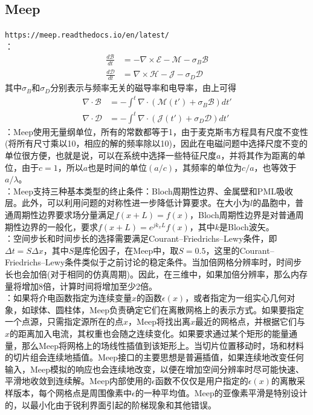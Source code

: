 \documentclass{article}
\numberwithin{equation}{section}
\renewcommand{\vec}[1]{\boldsymbol{#1}}
\begin{document}
\subsection{Meep}
\texttt{https://meep.readthedocs.io/en/latest/} \\
\textbf{\color{blue}{Meep仿真的麦克斯韦方程}}：
\begin{align}
    \frac{d\vec{\mathcal{B}}}{dt}&=-\nabla\times\vec{\mathcal{E}}-\vec{\mathcal{M}}-\sigma_B\vec{\mathcal{B}} \\
    \frac{d\vec{\mathcal{D}}}{dt}&=\nabla\times\vec{\mathcal{H}}-\vec{\mathcal{J}}-\sigma_D\vec{\mathcal{D}}
\end{align}
其中$\sigma_B$和$\sigma_D$分别表示与频率无关的磁导率和电导率，由上可得
\begin{align}
    \nabla\cdot\vec{\mathcal{B}}&=-\int^t\nabla\cdot\left(\vec{\mathcal{M}}(t')+\sigma_B\vec{\mathcal{B}}\right)dt' \\
    \nabla\cdot\vec{\mathcal{D}}&=-\int^t\nabla\cdot\left(\vec{\mathcal{J}}(t')+\sigma_D\vec{\mathcal{D}}\right)dt'
\end{align}
\textbf{\color{blue}{Meep的单位}}：Meep使用无量纲单位，所有的常数都等于1，由于麦克斯韦方程具有尺度不变性(将所有尺寸乘以10，相应的解的频率除以10)，因此在电磁问题中选择尺度不变的单位很方便，也就是说，可以在系统中选择一些特征尺度$a$，并将其作为距离的单位，由于$c=1$，所以$a$也是时间的单位$(a/c)$，其频率的单位为$c/a$，也等效于$a/\lambda$。\\
\textbf{\color{blue}{Meep的边界条件}}：Meep支持三种基本类型的终止条件：Bloch周期性边界、金属壁和PML吸收层。此外，可以利用问题的对称性进一步降低计算要求。在大小为$l$的晶胞中，普通周期性边界要求场分量满足$f(x+L)=f(x)$，Bloch周期性边界是对普通周期性边界的一般化，要求$f(x+L)=e^{jk_xL}f(x)$，其中$k$是Bloch波矢。\\
\textbf{\color{blue}{Meep的稳定条件}}：空间步长和时间步长的选择需要满足Courant–Friedrichs–Lewy条件，即$\Delta t=S\Delta x$，其中$S$是库伦因子，在Meep中，取$S=0.5$，这里的Courant–Friedrichs–Lewy条件类似于之前讨论的稳定条件。当加倍网格分辨率时，时间步长也会加倍(对于相同的仿真周期)。因此，在三维中，如果加倍分辨率，那么内存量将增加8倍，计算时间将增加至少2倍。\\
\textbf{\color{blue}{Meep的插值过程}}：如果将介电函数指定为连续变量$x$的函数$\epsilon(x)$，或者指定为一组实心几何对象，如球体、圆柱体，Meep负责确定它们在离散网格上的表示方式。如果要指定一个点源，只需指定源所在的点$x$，Meep将找出离$x$最近的网格点，并根据它们与$x$的距离加入电流，其权重也会随之连续变化。如果要求通过某个矩形的能量通量，那么Meep将网格上的场线性插值到该矩形上。当切片位置移动时，场和材料的切片组会连续地插值。Meep接口的主要思想是普遍插值，如果连续地改变任何输入，Meep模拟的响应也会连续地改变，以便在增加空间分辨率时尽可能快速、平滑地收敛到连续解。Meep内部使用的$\epsilon$函数不仅仅是用户指定的$\epsilon(x)$的离散采样版本，每个网格点是周围像素中$\epsilon$的一种平均值。Meep的亚像素平滑是特别设计的，以最小化由于锐利界面引起的阶梯现象和其他错误。\\
\end{document}
